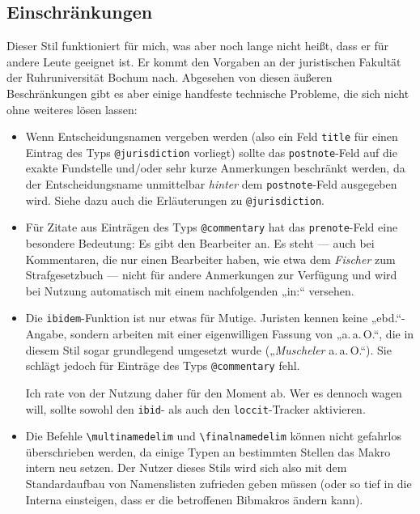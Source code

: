 \documentclass[11pt,a4paper,DIV=calc]{scrartcl}
\begin{document}
\subsection{Einschränkungen}

Dieser Stil funktioniert für mich, was aber noch lange nicht heißt,
dass er für andere Leute geeignet ist. Er kommt den Vorgaben an der
juristischen Fakultät der Ruhruniversität Bochum nach. Abgesehen von
diesen äußeren Beschränkungen gibt es aber einige handfeste technische
Probleme, die sich nicht ohne weiteres lösen lassen:

\begin{itemize}
\item Wenn Entscheidungsnamen vergeben werden (also ein Feld
  \verb+title+ für einen Eintrag des Typs \verb+@jurisdiction+
  vorliegt) sollte das \verb+postnote+-Feld auf die exakte Fundstelle und/oder
  sehr kurze Anmerkungen beschränkt werden, da der Entscheidungsname
  unmittelbar \emph{hinter} dem \verb+postnote+-Feld ausgegeben wird.
  Siehe dazu auch die Erläuterungen zu \verb+@jurisdiction+.
\item Für Zitate aus Einträgen des Typs \verb+@commentary+ hat das
  \verb+prenote+-Feld eine besondere Bedeutung: Es gibt den Bearbeiter
  an. Es steht — auch bei Kommentaren, die nur einen Bearbeiter haben,
  wie etwa dem \emph{Fischer} zum Strafgesetzbuch — nicht für andere
  Anmerkungen zur Verfügung und wird bei Nutzung automatisch mit einem
  nachfolgenden „in:“ versehen.
\item Die \verb+ibidem+-Funktion ist nur etwas für Mutige. Juristen
  kennen keine „ebd.“-Angabe, sondern arbeiten mit einer eigenwilligen
  Fassung von „a.\,a.\,O.“, die in diesem Stil sogar grundlegend umgesetzt
  wurde („\textit{Muscheler} a.\,a.\,O.“). Sie schlägt jedoch für Einträge
  des Typs \verb+@commentary+ fehl.

  Ich rate von der Nutzung daher für den Moment ab. Wer es dennoch
  wagen will, sollte sowohl den \verb+ibid+- als auch den
  \verb+loccit+-Tracker aktivieren.
\item Die Befehle \verb+\multinamedelim+ und \verb+\finalnamedelim+
  können nicht gefahrlos überschrieben werden, da einige Typen an
  bestimmten Stellen das Makro intern neu setzen. Der Nutzer dieses
  Stils wird sich also mit dem Standardaufbau von Namenslisten
  zufrieden geben müssen (oder so tief in die Interna einsteigen, dass
  er die betroffenen Bibmakros ändern kann).
\end{itemize}
\end{document}
